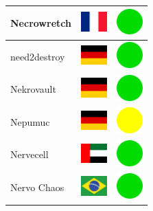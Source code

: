 \documentclass[12pt, a4paper, twoside]{report}
\begin{document}
\begin{center}
\begin{longtable}{|p{5cm}|p{2cm}|p{2cm}|}
 Necrowretch                                                & \includegraphics[width=1cm]{../img/flags/fr} &   \includegraphics[width=1cm]{../likes/y} \\ \hline
 need2destroy                                               & \includegraphics[width=1cm]{../img/flags/de} &   \includegraphics[width=1cm]{../likes/y} \\ \hline
 Nekrovault                                                 & \includegraphics[width=1cm]{../img/flags/de} &   \includegraphics[width=1cm]{../likes/y} \\ \hline
 Nepumuc                                                    & \includegraphics[width=1cm]{../img/flags/de} &   \includegraphics[width=1cm]{../likes/m} \\ \hline
 Nervecell                                                  & \includegraphics[width=1cm]{../img/flags/ae} &   \includegraphics[width=1cm]{../likes/y} \\ \hline
 Nervo Chaos                                                & \includegraphics[width=1cm]{../img/flags/br} &   \includegraphics[width=1cm]{../likes/y} \\ \hline

\end{longtable}
\end{center}
\end{document}
